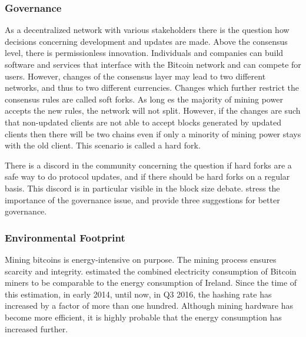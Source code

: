 



\subsubsection{Governance}

As a decentralized network with various stakeholders there is the question how decisions concerning development and updates are made. Above the consensus level, there is permissionless innovation. Individuals and companies can build software and services that interface with the Bitcoin network and can compete for users. However, changes of the consensus layer may lead to two different networks, and thus to two different currencies. Changes which further restrict the consensus rules are called soft forks. As long es the majority of mining power accepts the new rules, the network will not split. However, if the changes are such that non-updated clients are not able to accept blocks generated by updated clients then there will be two chains even if only a minority of mining power stays with the old client. This scenario is called a hard fork. 

There is a discord in the community concerning the question if hard forks are a safe way to do protocol updates, and if there should be hard forks on a regular basis. This discord is in particular visible in the block size debate. \cite{narayanan2015b} stress the importance of the governance issue, and provide three suggestions for better governance.

\subsubsection{Environmental Footprint}

Mining bitcoins is energy-intensive on purpose. The mining process ensures scarcity and integrity. \cite{6912770} estimated the combined electricity consumption of Bitcoin miners to be comparable to the energy consumption of Ireland. Since the time of this estimation, in early 2014, until now, in Q3 2016, the hashing rate has increased by a factor of more than one hundred. Although mining hardware has become more efficient, it is highly probable that the energy consumption has increased further.

